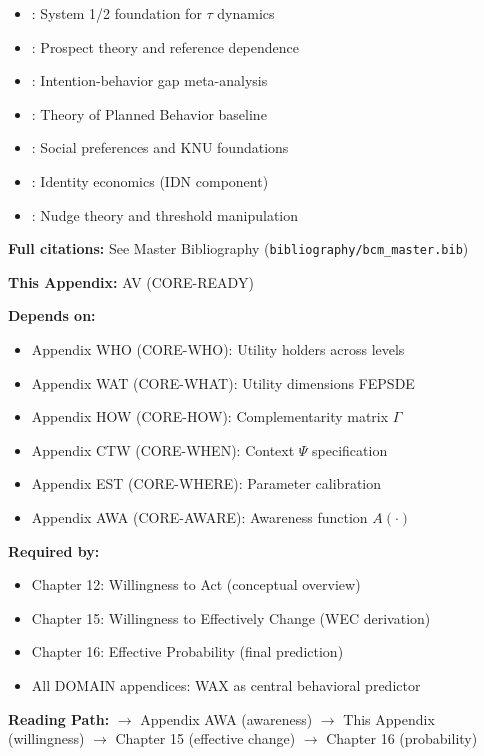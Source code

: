 \begin{itemize}[nosep]
    \item \citet{kahneman2011}: System 1/2 foundation for $\tau$ dynamics
    \item \citet{tversky1992}: Prospect theory and reference dependence
    \item \citet{sheeran2016}: Intention-behavior gap meta-analysis
    \item \citet{ajzen1991}: Theory of Planned Behavior baseline
    \item \citet{fehr1999}: Social preferences and KNU foundations
    \item \citet{akerlof2000}: Identity economics (IDN component)
    \item \citet{PAP-thaler2008}: Nudge theory and threshold manipulation
\end{itemize}

\textbf{Full citations:} See Master Bibliography (\texttt{bibliography/bcm\_master.bib})


\begin{tcolorbox}[colback=gray!10!white, colframe=gray!75!black,
    title=\textbf{Cross-Reference Footer}]

\textbf{This Appendix:} AV (CORE-READY)

\textbf{Depends on:}
\begin{itemize}[nosep]
    \item Appendix WHO (CORE-WHO): Utility holders across levels
    \item Appendix WAT (CORE-WHAT): Utility dimensions FEPSDE
    \item Appendix HOW (CORE-HOW): Complementarity matrix $\Gamma$
    \item Appendix CTW (CORE-WHEN): Context $\Psi$ specification
    \item Appendix EST (CORE-WHERE): Parameter calibration
    \item Appendix AWA (CORE-AWARE): Awareness function $A(\cdot)$
\end{itemize}

\textbf{Required by:}
\begin{itemize}[nosep]
    \item Chapter 12: Willingness to Act (conceptual overview)
    \item Chapter 15: Willingness to Effectively Change (WEC derivation)
    \item Chapter 16: Effective Probability (final prediction)
    \item All DOMAIN appendices: WAX as central behavioral predictor
\end{itemize}

\textbf{Reading Path:}
$\rightarrow$ Appendix AWA (awareness) $\rightarrow$ This Appendix (willingness)
$\rightarrow$ Chapter 15 (effective change) $\rightarrow$ Chapter 16 (probability)

\end{tcolorbox}


